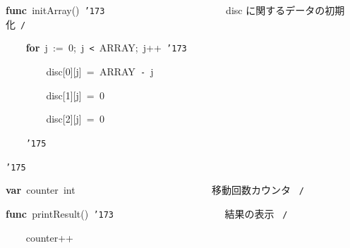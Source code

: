 \documentclass[a4paper,10pt]{article}
\def\mc{\relax}
\begin{document}
\noindent
\mbox{}\hfill

\noindent
\mbox{}\textbf{func}{\tt\mc \ }initArray(){\tt\mc \ }{\tt\char'173}{\tt\mc \ }{\tt\mc \ }{\tt\mc \ }{\tt\mc \ }{\tt\mc \ }{\tt\mc \ }{\tt\mc \ }{\tt\mc \ }{\tt\mc \ }{\tt\mc \ }{\tt\mc \ }{\tt\mc \ }{\tt\mc \ }{\tt\mc \ }{\tt\mc \ }{\tt\mc \ }{\tt\mc \ }{\tt\mc \ }{\tt\mc \ }{\tt\mc \ }{\tt\mc \ }{\tt\mc \ }\rm\mc {\tt /}{\tt *}\  \ disc に関するデータの初期化\hfill \rm\mc \ {\tt *}{\tt /}
\tt\mc 

\noindent
\mbox{}{\tt\mc \ }{\tt\mc \ }{\tt\mc \ }{\tt\mc \ }\textbf{for}{\tt\mc \ }j{\tt\mc \ }:={\tt\mc \ }0;{\tt\mc \ }j{\tt\mc \ }{\tt <}{\tt\mc \ }ARRAY;{\tt\mc \ }j++{\tt\mc \ }{\tt\char'173}

\noindent
\mbox{}{\tt\mc \ }{\tt\mc \ }{\tt\mc \ }{\tt\mc \ }{\tt\mc \ }{\tt\mc \ }{\tt\mc \ }{\tt\mc \ }disc[0][j]{\tt\mc \ }={\tt\mc \ }ARRAY{\tt\mc \ }{\tt -}{\tt\mc \ }j

\noindent
\mbox{}{\tt\mc \ }{\tt\mc \ }{\tt\mc \ }{\tt\mc \ }{\tt\mc \ }{\tt\mc \ }{\tt\mc \ }{\tt\mc \ }disc[1][j]{\tt\mc \ }={\tt\mc \ }0

\noindent
\mbox{}{\tt\mc \ }{\tt\mc \ }{\tt\mc \ }{\tt\mc \ }{\tt\mc \ }{\tt\mc \ }{\tt\mc \ }{\tt\mc \ }disc[2][j]{\tt\mc \ }={\tt\mc \ }0

\noindent
\mbox{}{\tt\mc \ }{\tt\mc \ }{\tt\mc \ }{\tt\mc \ }{\tt\char'175}

\noindent
\mbox{}{\tt\char'175}

\noindent
\mbox{}\hfill

\noindent
\mbox{}\textbf{var}{\tt\mc \ }counter{\tt\mc \ }int{\tt\mc \ }{\tt\mc \ }{\tt\mc \ }{\tt\mc \ }{\tt\mc \ }{\tt\mc \ }{\tt\mc \ }{\tt\mc \ }{\tt\mc \ }{\tt\mc \ }{\tt\mc \ }{\tt\mc \ }{\tt\mc \ }{\tt\mc \ }{\tt\mc \ }{\tt\mc \ }{\tt\mc \ }{\tt\mc \ }{\tt\mc \ }{\tt\mc \ }{\tt\mc \ }{\tt\mc \ }{\tt\mc \ }{\tt\mc \ }{\tt\mc \ }\rm\mc {\tt /}{\tt *}\  \ 移動回数カウンタ \hfill \rm\mc \ {\tt *}{\tt /}
\tt\mc 

\noindent
\mbox{}\hfill

\noindent
\mbox{}\textbf{func}{\tt\mc \ }printResult(){\tt\mc \ }{\tt\char'173}{\tt\mc \ }{\tt\mc \ }{\tt\mc \ }{\tt\mc \ }{\tt\mc \ }{\tt\mc \ }{\tt\mc \ }{\tt\mc \ }{\tt\mc \ }{\tt\mc \ }{\tt\mc \ }{\tt\mc \ }{\tt\mc \ }{\tt\mc \ }{\tt\mc \ }{\tt\mc \ }{\tt\mc \ }{\tt\mc \ }{\tt\mc \ }{\tt\mc \ }\rm\mc {\tt /}{\tt *}\  \ 結果の表示 \hfill \rm\mc \ {\tt *}{\tt /}
\tt\mc 

\noindent
\mbox{}{\tt\mc \ }{\tt\mc \ }{\tt\mc \ }{\tt\mc \ }counter++
\end{document}
